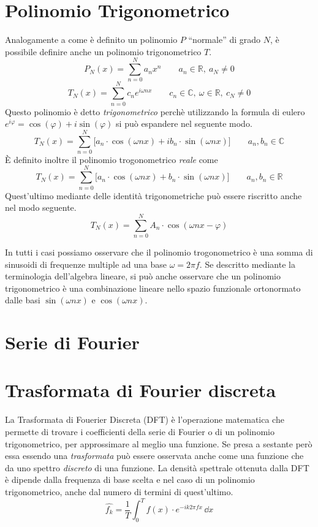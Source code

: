 \section{Polinomio Trigonometrico}
Analogamente a come \`e definito un polinomio \(P\) ``normale'' di grado
\(N\), \`e possibile definire anche un polinomio trigonometrico \(T\).
\[
    P_N(x) = \sum_{n=0}^N a_n x^n \qquad a_n \in \mathbb{R},~ a_N \neq 0
\]
\[
    T_N(x) = \sum_{n=0}^N c_n e^{i\omega nx} 
        \qquad c_n \in\mathbb{C},~\omega\in\mathbb{R}, ~ c_N \neq 0
\]
Questo polinomio \`e detto \emph{trigonometrico} perch\`e utilizzando la
formula di eulero \(e^{i\varphi} = \cos(\varphi) + i\sin(\varphi)\) si pu\`o
espandere nel seguente modo.
\[
    T_N(x) = \sum_{n=0}^N\big [a_n\cdot\cos(\omega nx) + ib_n\cdot\sin(\omega nx)]
    \qquad a_n, b_n \in \mathbb{C}
\]
\`E definito inoltre il polinomio trogonometrico \emph{reale} come
\[
    T_N(x) = \sum_{n=0}^N\big [a_n\cdot\cos(\omega nx) + b_n\cdot\sin(\omega nx)]
    \qquad a_n, b_n \in \mathbb{R}
\]
Quest'ultimo mediante delle identit\`a trigonometriche pu\`o essere riscritto
anche nel modo seguente.
\[
    T_N(x) = \sum_{n=0}^N A_n\cdot\cos(\omega nx - \varphi)
\]

In tutti i casi possiamo osservare che il polinomio trogonometrico \`e una
somma di sinusoidi di frequenze multiple ad una base \(\omega = 2\pi f\).
Se descritto mediante la terminologia dell'algebra lineare, si pu\`o anche
osservare che un polinomio trigonometrico \`e una combinazione lineare nello
spazio funzionale ortonormato dalle basi \(\sin(\omega nx)\) e \(\cos(\omega
nx)\).


\section{Serie di Fourier}

\section{Trasformata di Fourier discreta}
La Trasformata di Fouerier Discreta (DFT) \`e l'operazione matematica che
permette di trovare i coefficienti della serie di Fourier o di un polinomio
trigonometrico, per approssimare al meglio una funzione. Se presa a sestante
per\`o essa essendo una \emph{trasformata} pu\`o essere osservata anche come
una funzione che da uno spettro \emph{discreto} di una funzione. La densit\`a
spettrale ottenuta dalla DFT \`e dipende dalla frequenza di base scelta e nel
caso di un polinomio trigonometrico, anche dal numero di termini di
quest'ultimo.
\[
    \hat{f_k} = \frac{1}{T}\int_0^T f(x)\cdot e^{-ik2\pi fx}\,\dd{x}
\]

